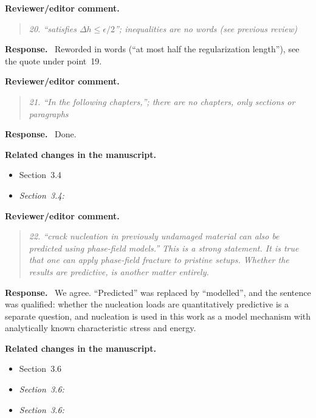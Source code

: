 \documentclass[pdflatex,sn-mathphys-num]{sn-jnl}
\newenvironment{reviewercomment}
  {\par\noindent\textbf{Reviewer/editor comment.}\begin{quote}\itshape}
  {\end{quote}}
\newenvironment{response}
  {\par\noindent\textbf{Response.}\ }
  {\par}
\newenvironment{relatedchanges}
  {\par\noindent\textbf{Related changes in the manuscript.}\begin{itemize}\small}
  {\end{itemize}}
\newcommand{\msloc}[1]{\textit{#1:}\ }
\newcommand{\relhead}[1]{\item[]\vspace*{0.2\baselineskip}#1}
\begin{document}
\begin{reviewercomment}
20. ``satisfies $\Delta h \le \epsilon/2$''; inequalities are no words (see previous review)
\end{reviewercomment}
\begin{response}
Reworded in words (``at most half the regularization length''), see the quote under point~19.
\end{response}

\begin{reviewercomment}
21. ``In the following chapters,''; there are no chapters, only sections or paragraphs
\end{reviewercomment}
\begin{response}
Done.
\end{response}
\begin{relatedchanges}
\relhead{Section~3.4}
\item \msloc{Section~3.4}
\end{relatedchanges}

\begin{reviewercomment}
22. ``crack nucleation in previously undamaged material can also be predicted using phase-field models.'' This is a
strong statement. It is true that one can apply phase-field fracture to pristine setups. Whether the results are
\emph{predictive}, is another matter entirely.
\end{reviewercomment}
\begin{response}
We agree. ``Predicted'' was replaced by ``modelled'', and the sentence was qualified: whether the nucleation loads are quantitatively predictive is a separate question, and nucleation is used in this work as a model mechanism with analytically known characteristic stress and energy.
\end{response}
\begin{relatedchanges}
\relhead{Section~3.6}
\item \msloc{Section~3.6}
\item \msloc{Section~3.6}
\end{relatedchanges}
\end{document}
